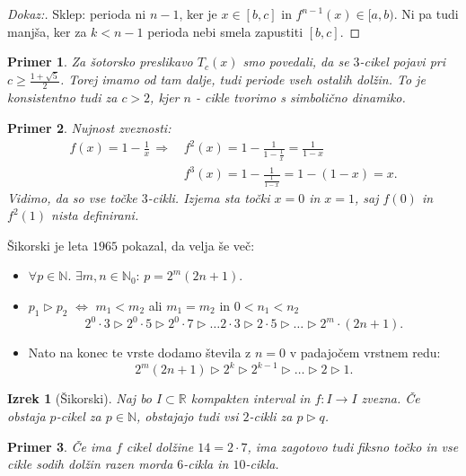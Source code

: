 \documentclass{article}
\newtheorem{primer}{Primer}
\newtheorem{izrek}{Izrek}
\newcommand{\N}{\mathbb{N}}
\newcommand{\R}{\mathbb{R}}
\begin{document}
\begin{proof}[Dokaz:]
Sklep: perioda ni $n-1$, ker je $x\in [b, c]$ in $f^{n-1}(x)\in [a, b)$. 
Ni pa tudi manjša, ker za $k < n-1$ perioda nebi smela zapustiti $[b, c]$.
\end{proof}

\begin{primer}
Za šotorsko preslikavo $T_c(x)$ smo povedali, da se $3$-cikel pojavi 
pri $c \geq \frac{1 + \sqrt{5}}{2}$. Torej imamo od tam dalje, tudi periode 
vseh ostalih dolžin. To je konsistentno tudi za $c > 2$, kjer $n$ - cikle 
tvorimo s simbolično dinamiko. 
\end{primer}

\begin{primer}
Nujnost zveznosti: 
\begin{align*}
f(x) = 1 - \frac{1}{x} \,\Longrightarrow\, &f^2(x) = 1 - \frac{1}{1 - \frac{1}{x}} = \frac{1}{1-x} \\
&f^3(x) = 1 - \frac{1}{\frac{1}{1-x}} = 1 - (1-x) = x.
\end{align*}
Vidimo, da so vse točke $3$-cikli. Izjema sta točki $x = 0$ in $x = 1$, 
saj $f(0)$ in $f^2(1)$ nista definirani.
\end{primer}

Šikorski je leta $1965$ pokazal, da velja še več: 
\begin{itemize}
    \item $\forall p\in \N$. $\exists m, n\in \N_0$: $p = 2^m(2n+1)$.
    \item $p_1 \triangleright p_2$ $\iff$ $m_1 < m_2$ ali $m_1 = m_2$ in $0 < n_1 < n_2$
    $$
    2^0 \cdot 3 \triangleright 2^0 \cdot 5 \triangleright 2^0 \cdot 7 \triangleright \dots 2\cdot 3 \triangleright 2\cdot 5 \triangleright \dots \triangleright 2^m \cdot (2n+1).
    $$
    \item Nato na konec te vrste dodamo števila z $n=0$ v padajočem 
    vrstnem redu:
    $$
    2^m (2n+1) \triangleright 2^k \triangleright 2^{k-1} \triangleright \dots \triangleright 2 \triangleright 1.
    $$
\end{itemize}

\begin{izrek}[Šikorski]
Naj bo $I \subset \R$ kompakten interval in $f: I \rightarrow I$ zvezna.
Če obstaja $p$-cikel za $p\in \N$, obstajajo tudi vsi $2$-cikli 
za $p\triangleright q$.
\end{izrek}

\begin{primer}
Če ima $f$ cikel dolžine $14 = 2\cdot 7$, ima zagotovo tudi fiksno 
točko in vse cikle sodih dolžin razen morda $6$-cikla in $10$-cikla.
\end{primer}
\end{document}
